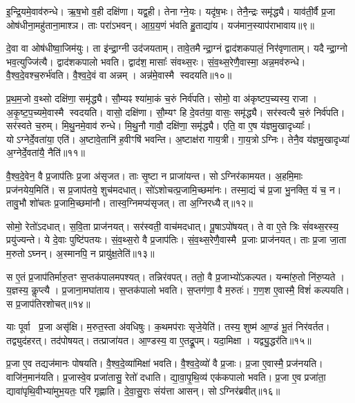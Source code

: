 इ॒न्द्रि॒यमे॒वाव॑रुन्धे।
ऋ॒ष॒भो व॒ही दक्षि॑णा।
यद्व॒ही।
तेनाग्ने॒यः।
यदृ॑ष॒भः।
तेनै॒न्द्रः समृ॑द्ध्यै।
याव॑ती॒र्वै प्र॒जा ओष॑धीना॒महु॑ताना॒माश्ञ\sn{}।
ताः परा॑\-ऽभवन्।
आ॒ग्र॒य॒णं भ॑वति हु॒ताद्या॑य।
यज॑मान॒स्याप॑रा\-भावाय॥९॥

दे॒वा वा ओष॑धीष्वा॒जिम॑युः।
ता इ॑न्द्रा॒ग्नी उद॑जयताम्।
तावे॒तमैन्द्रा॒ग्नं द्वाद॑शकपालं॒ निर॑वृणाताम्।
यदैन्द्रा॒ग्नो भव॒त्युज्जि॑त्यै।
द्वाद॑शकपालो भवति।
द्वाद॑श॒ मासाः᳚ संवथ्स॒रः।
सं॒व॒थ्स॒रेणै॒वास्मा॒ अन्न॒मव॑रुन्धे।
वै॒श्व॒दे॒व\-श्च॒रुर्भ॑वति।
वै॒श्व॒दे॒वं वा अन्नम्।
अन्न॑मे॒वास्मै स्वदयति॥१०॥

प्र॒थ॒म॒जो व॒थ्सो दक्षि॑णा॒ समृ॑द्ध्यै।
सौ॒म्यꣴ श्या॑मा॒कं च॒रुं निर्व॑पति।
सोमो॒ वा अ॑कृष्टप॒च्यस्य॒ राजा।
अ॒कृ॒ष्ट॒प॒च्यमे॒वास्मै स्वदयति।
वासो॒ दक्षि॑णा।
सौ॒म्यꣳ हि दे॒वत॑या॒ वासः॒ समृ॑द्ध्यै।
सर॑स्वत्यै च॒रुं निर्व॑पति।
सर॑स्वते च॒रुम्।
मि॒थु॒नमे॒वाव॑ रुन्धे।
मि॒थु॒नौ गावौ॒ दक्षि॑णा॒ समृ॑द्ध्यै।
एति॒ वा ए॒ष य॑ज्ञमु॒खादृध्याः᳚।
योऽग्नेर्दे॒वता॑या॒ एति॑।
अ॒ष्टावे॒तानि॑ ह॒वीꣳषि॑ भवन्ति।
अ॒ष्टाक्ष॑रा गाय॒त्री।
गा॒य॒त्रो\-ऽग्निः।
तेनै॒व य॑ज्ञमु॒खादृध्या॑ अ॒ग्नेर्दे॒वता॑यै॒ नैति॑॥११॥

वै॒श्व॒दे॒वेन॒ वै प्र॒जाप॑तिः प्र॒जा अ॑सृजत।
ताः सृ॒ष्टा न प्राजा॑यन्त।
सोऽग्निर॑कामयत।
अ॒हमि॒माः प्रज॑नयेय॒मिति॑।
स प्र॒जाप॑तये॒ शुच॑मदधात्।
सो॑ऽशोचत्प्र॒जामि॒च्छमा॑नः।
तस्मा॒द्यं च॑ प्र॒जा भु॒नक्ति॒ यं च॒ न।
तावु॒भौ शो॑चतः प्र॒जामि॒च्छमा॑नौ।
तास्व॒ग्निमप्य॑सृजत्।
ता अ॒ग्निरध्यैत्॥१२॥

सोमो॒ रेतो॑\-ऽदधात्।
स॒वि॒ता प्राज॑नयत्।
सर॑स्वती॒ वाच॑मदधात्।
पू॒षा\-ऽपो॑षयत्।
ते वा ए॒ते त्रिः सं॑वथ्स॒रस्य॒ प्रयु॑ज्यन्ते।
ये दे॒वाः पुष्टि॑पतयः।
सं॒व॒थ्स॒रो वै प्र॒जाप॑तिः।
सं॒व॒थ्स॒रेणै॒वास्मै प्र॒जाः प्राज॑नयत्।
ताः प्र॒जा जा॒ता म॒रुतो\-ऽघ्नन्।
अ॒स्मानपि॒ न प्रायु॑क्ष॒तेति॑॥१३॥

स ए॒तं प्र॒जाप॑तिर्मारु॒तꣳ स॒प्तक॑पालमपश्यत्।
तन्निर॑वपत्।
ततो॒ वै प्र॒जाभ्यो॑\-ऽकल्पत।
यन्मा॑रु॒तो नि॑रु॒प्यते।
य॒ज्ञस्य॒ कॢप्त्यै।
प्र॒जाना॒मघा॑ताय।
स॒प्तक॑पालो भवति।
स॒प्तग॑णा॒ वै म॒रुतः॑।
ग॒ण॒श ए॒वास्मै॒ विशं॑ कल्पयति।
स प्र॒जाप॑तिरशोचत्॥१४॥

याः पूर्वा प्र॒जा असृ॑क्षि।
म॒रुत॒स्ता अ॑वधिषुः।
क॒थमप॑राः सृजे॒येति॑।
तस्य॒ शुष्म॑ आ॒ण्डं भू॒तं निर॑वर्तत।
तद्व्युद॑हरत्।
तद॑पोषयत्।
तत्प्राजा॑यत।
आ॒ण्डस्य॒ वा ए॒तद्रू॒पम्।
यदा॒मिक्षा।
यद्व्यु॒द्धर॑ति॥१५॥

प्र॒जा ए॒व तद्यज॑मानः पोषयति।
वै॒श्व॒दे॒व्या॑मिक्षा॑ भवति।
वै॒श्व॒दे॒व्यो॑ वै प्र॒जाः।
प्र॒जा ए॒वास्मै॒ प्रज॑नयति।
वाजि॑न॒मान॑यति।
प्र॒जास्वे॒व प्रजा॑तासु॒ रेतो॑ दधाति।
द्या॒वा॒पृ॒थि॒व्य॑ एक॑कपालो भवति।
प्र॒जा ए॒व प्रजा॑ता॒ द्यावा॑पृथि॒वीभ्या॑मुभ॒यतः॒ परि॑ गृह्णाति।
दे॒वा॒सु॒राः संय॑त्ता आसन्।
सोऽग्निर॑ब्रवीत्॥१६॥

